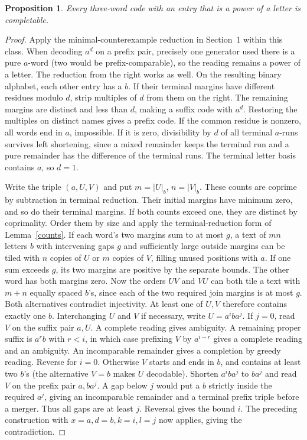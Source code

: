 \documentclass[11pt,a4paper]{article}
\newtheorem{prop}[lemma]{Proposition}
\newcommand{\bct}[1]{\lvert #1\rvert_b}
\begin{document}
\begin{prop}\label{power}
Every three-word code with an entry that is a power of a letter is completable.
\end{prop}
\begin{proof}
Apply the minimal-counterexample reduction in Section~1 within this class. When decoding $a^d$ on a prefix pair, precisely one generator used there is a pure $a$-word (two would be prefix-comparable), so the reading remains a power of a letter. The reduction from the right works as well. On the resulting binary alphabet, each other entry has a $b$. If their terminal margins have different residues modulo $d$, strip multiples of $d$ from them on the right. The remaining margins are distinct and less than $d$, making a suffix code with $a^d$. Restoring the multiples on distinct names gives a prefix code. If the common residue is nonzero, all words end in $a$, impossible. If it is zero, divisibility by $d$ of all terminal $a$-runs survives left shortening, since a mixed remainder keeps the terminal run and a pure remainder has the difference of the terminal runs. The terminal letter basis contains $a$, so $d=1$.

Write the triple $(a,U,V)$ and put $m=\bct U$, $n=\bct V$. These counts are coprime by subtraction in terminal reduction. Their initial margins have minimum zero, and so do their terminal margins. If both counts exceed one, they are distinct by coprimality. Order them by size and apply the terminal-reduction form of Lemma~\ref{counts}. If each word's two margins sum to at most $g$, a text of $mn$ letters $b$ with intervening gaps $g$ and sufficiently large outside margins can be tiled with $n$ copies of $U$ or $m$ copies of $V$, filling unused positions with $a$. If one sum exceeds $g$, its two margins are positive by the separate bounds. The other word has both margins zero. Now the orders $UV$ and $VU$ can both tile a text with $m+n$ equally spaced $b$'s, since each of the two required join margins is at most $g$. Both alternatives contradict injectivity.
At least one of $U,V$ therefore contains exactly one $b$. Interchanging $U$ and $V$ if necessary, write $U=a^i b a^j$. If $j=0$, read $V$ on the suffix pair $a,U$. A complete reading gives ambiguity. A remaining proper suffix is $a^r b$ with $r<i$, in which case prefixing $V$ by $a^{i-r}$ gives a complete reading and an ambiguity. An incomparable remainder gives a completion by greedy reading. Reverse for $i=0$. Otherwise $V$ starts and ends in $b$, and contains at least two $b$'s (the alternative $V=b$ makes $U$ decodable). Shorten $a^i b a^j$ to $ba^j$ and read $V$ on the prefix pair $a,ba^j$. A gap below $j$ would put a $b$ strictly inside the required $a^j$, giving an incomparable remainder and a terminal prefix triple before a merger. Thus all gaps are at least $j$. Reversal gives the bound $i$. The preceding construction with $x=a,d=b,k=i,l=j$ now applies, giving the contradiction.
\end{proof}
\end{document}
